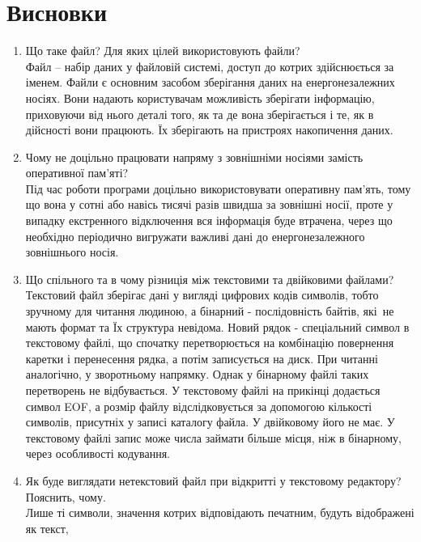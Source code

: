 \section{Висновки}
\label{sec:summary}

\begin{enumerate}
    \item Що таке файл? Для яких цілей використовують файли? \\
          Файл – набір даних у файловій системі, доступ до котрих здійснюється за іменем.
          Файли є основним засобом зберігання даних на енергонезалежних носіях.
          Вони надають користувачам можливість зберігати інформацію,
          приховуючи від нього деталі того, як та де вона зберігається і те,
          як в дійсності вони працюють. Їх зберігають на пристроях накопичення даних.
    \item Чому не доцільно працювати напряму з зовнішніми носіями замість оперативної пам'яті? \\
          Під час роботи програми доцільно використовувати оперативну пам'ять, тому що
          вона у сотні або навісь тисячі разів швидша за зовнішні носії, проте у випадку
          екстренного відключення вся інформація буде втрачена, через що необхідно
          періодично вигружати важливі дані до енергонезалежного зовнішнього носія.
    \item Що спільного та в чому різниція між текстовими та двійковими файлами? \\
          Текстовий файл зберігає дані у вигляді цифрових кодів символів, тобто зручному для
          читання людиною, а бінарний - послідовність байтів, які не мають формат та Їх
          структура невідома.
          Новий рядок - спеціальний символ в текстовому файлі, що спочатку перетворюється
          на комбінацію повернення каретки і перенесення рядка, а потім записується на диск.
          При читанні аналогічно, у зворотньому напрямку. Однак у бінарному файлі таких
          перетворень не відбувається.
          У текстовому файлі на прикінці додається символ EOF, а розмір файлу відслідковується
          за допомогою кількості символів, присутніх у записі каталогу файла.
          У двійковому його не має.
          У текстовому файлі запис може числа займати більше місця, ніж в бінарному,
          через особливості кодування.
    \item Як буде виглядати нетекстовий файл при відкритті у текстовому редактору? Пояснить, чому. \\
          Лише ті символи, значення котрих відповідають печатним, будуть відображені як текст,

\end{enumerate}
